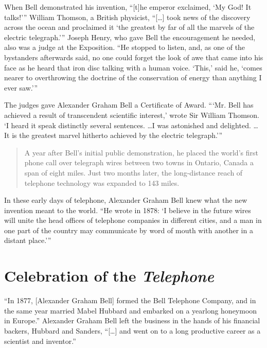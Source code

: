 \documentclass[12pt singlecol]{article}
\begin{document}
\begin{flushleft}
\begin{multicols}{2}
When Bell demonstrated his invention, ``[t]he emperor exclaimed, `My God! It talks!'''\cite[para.~13]{ATT13} William Thomson, a British physicist, ``[\ldots] took news of the discovery across the ocean and proclaimed it `the greatest by far of all the marvels of the electric telegraph.'''\cite[para.~13]{ATT13} Joseph Henry, who gave Bell the encouragement he needed, also was a judge at the Exposition. ``He stopped to listen, and, as one of the bystanders afterwards said, no one could forget the look of awe that came into his face as he heard that iron disc talking with a human voice. `This,' said he, `comes nearer to overthrowing the doctrine of the conservation of energy than anything I ever saw.''' \cite[p.~39]{Casson10}

The judges gave Alexander Graham Bell a Certificate of Award. ```Mr. Bell has achieved a result of transcendent scientific interest,' wrote Sir William Thomson. `I heard it speak distinctly several sentences. \ldots I was astonished and delighted. \ldots It is the greatest marvel hitherto achieved by the electric telegraph.''' \cite[p.~41]{Casson10}

\begin{quotation}
A year after Bell's initial public demonstration, he placed the world's first phone call over telegraph wires between two towns in Ontario, Canada \textemdash a span of eight miles. Just two months later, the long-distance reach of telephone technology was expanded to 143 miles.\cite[para.~7]{MIT00}
\end{quotation}

In these early days of telephone, Alexander Graham Bell knew what the new invention meant to the world. ``He wrote in 1878: `I believe in the future wires will unite the head offices of telephone companies in different cities, and a man in one part of the country may communicate by word of mouth with another in a distant place.'''\cite[para.~16]{ATT13}

\section{Celebration of the \emph{Telephone}}

``In 1877, [Alexander Graham Bell] formed the Bell Telephone Company, and in the same year married Mabel Hubbard and embarked on a yearlong honeymoon in Europe.''\cite[para.~1]{LOC00} Alexander Graham Bell left the business in the hands of his financial backers, Hubbard and Sanders, ``[\ldots] and went on to a long productive career as a scientist and inventor.''\cite[para.~15]{ATT13} 


\end{multicols}
\end{flushleft}
\end{document}
